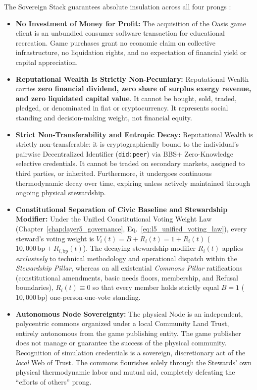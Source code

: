 The Sovereign Stack guarantees absolute insulation across all four prongs \parencite{howey1946, alamo1985}:
\begin{itemize}
    \item \textbf{No Investment of Money for Profit:} The acquisition of the Oasis game client is an unbundled consumer software transaction for educational recreation. Game purchases grant no economic claim on collective infrastructure, no liquidation rights, and no expectation of financial yield or capital appreciation.
    \item \textbf{Reputational Wealth Is Strictly Non-Pecuniary:} Reputational Wealth carries \textbf{zero financial dividend, zero share of surplus exergy revenue, and zero liquidated capital value}. It cannot be bought, sold, traded, pledged, or denominated in fiat or cryptocurrency. It represents social standing and decision-making weight, not financial equity.
    \item \textbf{Strict Non-Transferability and Entropic Decay:} Reputational Wealth is strictly non-transferable: it is cryptographically bound to the individual's pairwise Decentralized Identifier (\texttt{did:peer}) via BBS+ Zero-Knowledge selective credentials. It cannot be traded on secondary markets, assigned to third parties, or inherited. Furthermore, it undergoes continuous thermodynamic decay over time, expiring unless actively maintained through ongoing physical stewardship.
    \item \textbf{Constitutional Separation of Civic Baseline and Stewardship Modifier:} Under the Unified Constitutional Voting Weight Law (Chapter~\ref{chap:layer5_governance}, Eq.~\ref{eq:l5_unified_voting_law}), every steward's voting weight is $V_i(t) = B + R_i(t) = 1 + R_i(t)$ ($10{,}000\,\mathrm{bp} + R_{i,\mathrm{bp}}(t)$). The decaying stewardship modifier $R_i(t)$ applies \textit{exclusively} to technical methodology and operational dispatch within the \textit{Stewardship Pillar}, whereas on all existential \textit{Commons Pillar} ratifications (constitutional amendments, basic needs floors, membership, and Refusal boundaries), $R_i(t) \equiv 0$ so that every member holds strictly equal $B = 1$ ($10{,}000\,\mathrm{bp}$) one-person-one-vote standing.
    \item \textbf{Autonomous Node Sovereignty:} The physical Node is an independent, polycentric commons organized under a local Community Land Trust, entirely autonomous from the game publishing entity. The game publisher does not manage or guarantee the success of the physical community. Recognition of simulation credentials is a sovereign, discretionary act of the \textit{local} Web of Trust. The commons flourishes solely through the Stewards' own physical thermodynamic labor and mutual aid, completely defeating the ``efforts of others'' prong.
\end{itemize}


